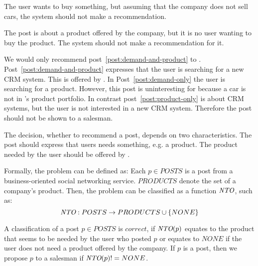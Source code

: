\begin{post}
	\centering
	\caption{The user wants to buy something, but assuming that the company does not sell cars, the system should not make a recommendation.}
	\label{post:demand-only}
\end{post}

\begin{post}
	\centering
	\caption{The post is about a product offered by the company, but it is no user wanting to buy the product. The system should not make a recommendation for it.}
	\label{post:product-only}
\end{post}

We would only recommend post~\ref{post:demand-and-product} to \acme.
Post~\ref{post:demand-and-product} expresses that the user is searching for a new CRM system.
This is offered by \acme.
In Post~\ref{post:demand-only} the user is searching for a product. 
However, this post is uninteresting for \acme because a car is not in \acme's product portfolio. 
In contrast post~\ref{post:product-only} is about CRM systems, but the user is not interested in a new CRM system.
Therefore the post should not be shown to a salesman.

The decision, whether to recommend a post, depends on two characteristics.
The post should express that users needs something, e.g. a product.
The product needed by the user should be offered by \acme.


Formally, the problem can be defined as: 
Each $p \in POSTS$ is a post from a business-oriented social networking service. $PRODUCTS$ denote the set of a company's product.
Then, the problem can be classified as a function $\emph{NTO}$, such as:
\begin{displaymath}
	\emph{NTO}: POSTS \to PRODUCTS \cup \{NONE\}
\end{displaymath}


A classification of a post $p \in POSTS$ is $correct$, if $\emph{NTO}(p)$ equates to the product that seems to be needed by the user who posted $p$ or equates to $NONE$ if the user does not need a product offered by the company. If $p$ is a post, then we propose $p$ to a salesman if $\emph{NTO}(p) != NONE$.

